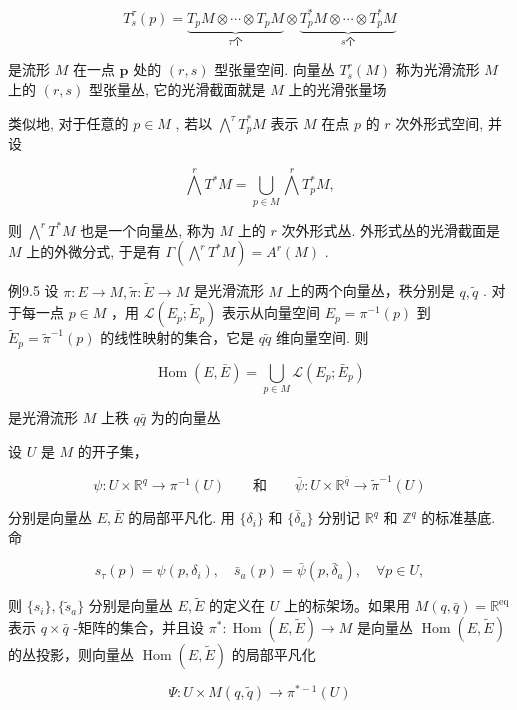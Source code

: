 $$
T _ {s} ^ {\tau} (p) = \underbrace {T _ {p} M \otimes \cdots \otimes T _ {p} M} _ {\tau \text {个}} \otimes \underbrace {T _ {p} ^ {*} M \otimes \cdots \otimes T _ {p} ^ {*} M} _ {s \text {个}}
$$

是流形  $M$  在一点  $\pmb{p}$  处的  $(r,s)$  型张量空间. 向量丛  $T_{s}^{r}(M)$  称为光滑流形  $M$  上的  $(r,s)$  型张量丛, 它的光滑截面就是  $M$  上的光滑张量场

类似地, 对于任意的  $p \in M$ , 若以  $\bigwedge^{\tau} T_{p}^{*} M$  表示  $M$  在点  $p$  的  $r$  次外形式空间, 并设

$$
\bigwedge^ {r} T ^ {*} M = \bigcup_ {p \in M} \bigwedge^ {r} T _ {p} ^ {*} M,
$$

则  $\bigwedge^r T^* M$  也是一个向量丛, 称为  $M$  上的  $r$  次外形式丛. 外形式丛的光滑截面是  $M$  上的外微分式, 于是有  $\Gamma (\bigwedge^{r}T^{*}M) = A^{r}(M)$ .

例9.5 设  $\pi : E \to M, \tilde{\pi} : \tilde{E} \to M$  是光滑流形  $M$  上的两个向量丛，秩分别是  $q, \tilde{q}$ . 对于每一点  $p \in M$ ，用  $\mathcal{L}(E_p; \tilde{E}_p)$  表示从向量空间  $E_p = \pi^{-1}(p)$  到  $\tilde{E}_p = \tilde{\pi}^{-1}(p)$  的线性映射的集合，它是  $q\tilde{q}$  维向量空间. 则

$$
\operatorname {H o m} (E, \bar {E}) = \bigcup_ {p \in M} \mathscr {L} \left(E _ {p}; \bar {E} _ {p}\right)
$$

是光滑流形  $M$  上秩  $q\bar{q}$  为的向量丛

设  $U$  是  $M$  的开子集，

$$
\psi : U \times \mathbb {R} ^ {q} \to \pi^ {- 1} (U) \qquad {\text {和}} \qquad \bar {\psi}: U \times \mathbb {R} ^ {\bar {q}} \to \tilde {\pi} ^ {- 1} (U)
$$

分别是向量丛  $E, \bar{E}$  的局部平凡化. 用  $\{\delta_i\}$  和  $\{\bar{\delta}_a\}$  分别记  $\mathbb{R}^q$  和  $\mathbb{Z}^q$  的标准基底. 命

$$
s _ {\tau} (p) = \psi (p, \delta_ {i}), \quad \bar {s} _ {a} (p) = \bar {\psi} (p, \bar {\delta} _ {a}), \quad \forall p \in U,
$$

则  $\{s_i\}, \{\tilde{s}_a\}$  分别是向量丛  $E, \tilde{E}$  的定义在  $U$  上的标架场。如果用  $M(q, \bar{q}) = \mathbb{R}^{\mathrm{eq}}$  表示  $q \times \bar{q}$ -矩阵的集合，并且设  $\pi^{*}: \operatorname{Hom}(E, \tilde{E}) \to M$  是向量丛  $\operatorname{Hom}(E, \tilde{E})$  的丛投影，则向量丛  $\operatorname{Hom}(E, \tilde{E})$  的局部平凡化

$$
\Psi : U \times M (q, \tilde {q}) \rightarrow \pi^ {* - 1} (U)
$$

